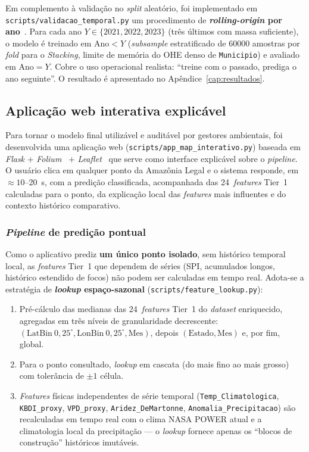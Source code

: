 Em complemento à validação no \emph{split} aleatório, foi implementado em \texttt{scripts/validacao\_temporal.py} um procedimento de \textbf{\emph{rolling-origin} por ano}~\cite{bergmeir2012cv}. Para cada ano \(Y \in \{2021, 2022, 2023\}\) (três últimos com massa suficiente), o modelo é treinado em \(\text{Ano} < Y\) (\emph{subsample} estratificado de \num{60000} amostras por \emph{fold} para o \emph{Stacking}, limite de memória do OHE denso de \texttt{Municipio}) e avaliado em \(\text{Ano} = Y\). Cobre o uso operacional realista: ``treine com o passado, prediga o ano seguinte''. O resultado é apresentado no Apêndice~\ref{cap:resultados}.

\subsection{Aplicação web interativa explicável}
\label{sec:metod_app_web}

Para tornar o modelo final utilizável e auditável por gestores ambientais, foi desenvolvida uma aplicação web (\texttt{scripts/app\_map\_interativo.py}) baseada em \emph{Flask} + \emph{Folium}~\cite{folium} + \emph{Leaflet}~\cite{leafletjs} que serve como interface explicável sobre o \emph{pipeline}. O usuário clica em qualquer ponto da Amazônia Legal e o sistema responde, em \(\approx 10\)--\SI{20}{\second}, com a predição classificada, acompanhada das 24~\emph{features} Tier~1 calculadas para o ponto, da explicação local das \emph{features} mais influentes e do contexto histórico comparativo.

\subsubsection{\emph{Pipeline} de predição pontual}

Como o aplicativo prediz \textbf{um único ponto isolado}, sem histórico temporal local, as \emph{features} Tier~1 que dependem de séries (SPI, acumulados longos, histórico estendido de focos) não podem ser calculadas em tempo real. Adota-se a estratégia de \textbf{\emph{lookup} espaço-sazonal} (\texttt{scripts/feature\_lookup.py}):

\begin{enumerate}
  \item Pré-cálculo das medianas das 24~\emph{features} Tier~1 do \emph{dataset} enriquecido, agregadas em três níveis de granularidade decrescente: \((\text{LatBin}~0{,}25^\circ, \text{LonBin}~0{,}25^\circ, \text{Mes})\), depois \((\text{Estado}, \text{Mes})\) e, por fim,  global.

  \item Para o ponto consultado, \emph{lookup} em cascata (do mais fino ao mais grosso) com tolerância de \(\pm 1\) célula.

  \item \emph{Features} físicas independentes de série temporal (\texttt{Temp\_Climatologica}, \texttt{KBDI\_proxy}, \texttt{VPD\_proxy}, \texttt{Aridez\_DeMartonne}, \texttt{Anomalia\_Precipitacao}) são recalculadas em tempo real com o clima NASA POWER atual e a climatologia local da precipitação --- o \emph{lookup} fornece apenas os ``blocos de construção'' históricos imutáveis.
\end{enumerate}

